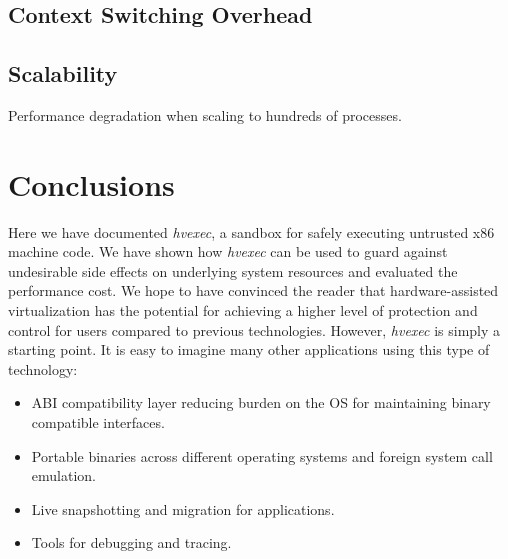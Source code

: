 \documentclass{article}
\newcommand{\PROJNAME}{\textit{hvexec}}
\begin{document}
\subsection{Context Switching Overhead}
\subsection{Scalability}
Performance degradation when scaling to hundreds of processes.

\section{Conclusions}
Here we have documented \PROJNAME{}, a sandbox for safely executing untrusted x86 machine code.
We have shown how \PROJNAME{} can be used to guard against undesirable side effects on underlying system resources and evaluated the performance cost.
We hope to have convinced the reader that hardware-assisted virtualization has the potential for achieving a higher level of protection and control for users compared to previous technologies. However, \PROJNAME{} is simply a starting point. It is easy to imagine many other applications using this type of technology:

\begin{itemize}
    \item
        ABI compatibility layer reducing burden on the OS for maintaining binary compatible interfaces.
    \item
        Portable binaries across different operating systems and foreign system call emulation.
    \item
        Live snapshotting and migration for applications.
    \item
        Tools for debugging and tracing.
\end{itemize}
\end{document}
